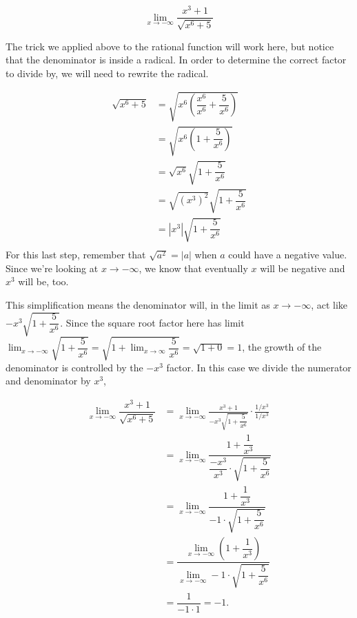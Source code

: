 \documentclass{ximera}
\begin{document}
\begin{example}

\[
\lim_{x\to -\infty} \frac{x^3+1}{\sqrt{x^6+5}}
\]
\begin{explanation}

The trick we applied above to the rational function will work here, but notice that the denominator is inside a radical. In order to determine the correct factor to divide by, we will need to rewrite the radical.

\begin{align*}
	\sqrt{x^6 + 5} &= \sqrt{ x^6\left(\dfrac{x^6}{x^6} + \dfrac{5}{x^6}\right)}\\
				&=	\sqrt{ x^6\left( 1 + \dfrac{5}{x^6}\right) }\\
				&= \sqrt{x^6} \sqrt{1 + \dfrac{5}{x^6} }\\
				&= \sqrt{(x^3)^2} \sqrt{1 + \dfrac{5}{x^6} }\\
				&= |x^3|\sqrt{1 + \dfrac{5}{x^6} }\\
\end{align*}
For this last step, remember that $\sqrt{a^2} = |a|$ when $a$ could have a negative value. Since we're looking at $x\to -\infty$, 
we know that eventually $x$ will be negative and $x^3$ will be, too.

This simplification means the denominator will, in the limit as $x\to -\infty$, act like $-x^3\sqrt{1+\dfrac{5}{x^6}}$. Since the square root factor here
has limit $\displaystyle \lim_{x\to -\infty} \sqrt{1 + \dfrac{5}{x^6} } = \sqrt{1 + \lim_{x\to \infty} \dfrac{5}{x^6}} = \sqrt{1+0}=1$, the growth of the denominator is controlled by the $-x^3$ factor. In this case we divide the numerator and denominator by $x^3$,

\begin{align*}
\lim_{x\to -\infty} \dfrac{x^3+1}{\sqrt{x^6+5}} &= \lim_{x\to -\infty} \frac{x^3+1}{-x^3 \sqrt{1 + \dfrac{5}{x^6} }} \cdot \frac{1/x^3}{1/x^3}\\
	&= \lim_{x\to -\infty} \dfrac{1+\dfrac{1}{x^3}}{\dfrac{-x^3}{x^3}\cdot\sqrt{1+\dfrac{5}{x^6}}}\\
	&= \lim_{x\to -\infty} \dfrac{1+\dfrac{1}{x^3}}{-1\cdot \sqrt{1+\dfrac{5}{x^6}}} \\
	&= \dfrac{ \lim_{x\to -\infty}\left(1+\dfrac{1}{x^3}\right)}{\lim_{x\to -\infty}-1\cdot\sqrt{1+\dfrac{5}{x^6}}}\\
	&= \dfrac{1}{-1\cdot 1} = -1.
\end{align*}

\end{explanation}
\end{example}
\end{document}
